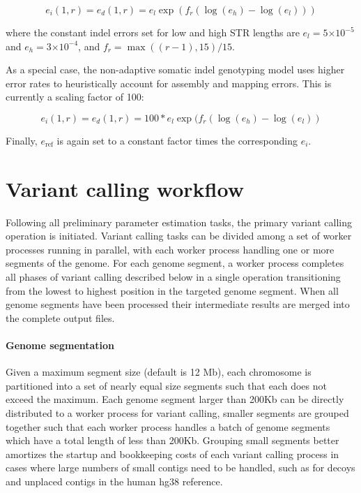 \documentclass{article}
\newcommand{\e}[1]{\ensuremath{\times 10^{#1}}}
\begin{document}
\begin{equation*}
e_i(1,r) = e_d(1,r) = e_{l} \exp(f_r(\log(e_{h})-\log(e_{l})))
\end{equation*}

\noindent where the constant indel errors set for low and high STR lengths are $e_{l} = 5\e{-5}$ and $e_{h} = 3\e{-4}$, and $f_r = \max((r-1),15)/15$.

As a special case, the non-adaptive somatic indel genotyping model uses higher error rates to heuristically account for assembly and mapping errors. This is currently a scaling factor of 100: 

\begin{equation*}
e_i(1,r) = e_d(1,r) = 100 * e_{l} \exp(f_r(\log(e_{h})-\log(e_{l}))
\end{equation*}

Finally, $e_{\text{ref}}$ is again set to a constant factor  times the corresponding $e_i$.


\section{Variant calling workflow}

Following all preliminary parameter estimation tasks, the primary variant calling operation is initiated. Variant calling tasks can be divided among a set of worker processes running in parallel, with each worker process handling one or more segments of the genome. For each genome segment, a worker process completes all phases of variant calling described below in a single operation transitioning from the lowest to highest position in the targeted genome segment. When all genome segments have been processed their intermediate results are merged into the complete output files.

\paragraph{Genome segmentation} Given a maximum segment size (default is 12 Mb), each chromosome is partitioned into a set of nearly equal size segments such that each does not exceed the maximum. Each genome segment larger than 200Kb can be directly distributed to a worker process for variant calling, smaller segments are grouped together such that each worker process handles a batch of genome segments which have a total length of less than 200Kb. Grouping small segments better amortizes the startup and bookkeeping costs of each variant calling process in cases where large numbers of small contigs need to be handled, such as for decoys and unplaced contigs in the human hg38 reference.
\end{document}
